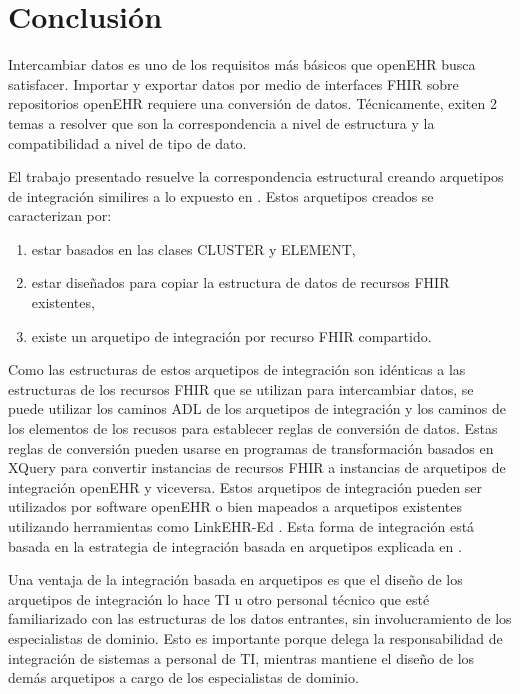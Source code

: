 \section{Conclusión}

Intercambiar datos es uno de los requisitos más básicos que openEHR busca satisfacer. Importar y exportar datos por medio de interfaces FHIR sobre repositorios openEHR requiere una conversión de datos. Técnicamente, exiten 2 temas a resolver que son la correspondencia a nivel de estructura y la compatibilidad a nivel de tipo de dato.

El trabajo presentado resuelve la correspondencia estructural creando arquetipos de integración similires a lo expuesto en \cite{openEHRArchitecture}. Estos arquetipos creados se caracterizan por:

\begin{enumerate}
  \item estar basados en las clases CLUSTER y ELEMENT,
  \item estar diseñados para copiar la estructura de datos de recursos FHIR existentes,
  \item existe un arquetipo de integración por recurso FHIR compartido.
\end{enumerate}

Como las estructuras de estos arquetipos de integración son idénticas a las estructuras de los recursos FHIR que se utilizan para intercambiar datos, se puede utilizar los caminos ADL de los arquetipos de integración y los caminos de los elementos de los recusos para establecer reglas de conversión de datos. Estas reglas de conversión pueden usarse en programas de transformación basados en XQuery para convertir instancias de recursos FHIR a instancias de arquetipos de integración openEHR y viceversa. Estos arquetipos de integración pueden ser utilizados por software openEHR o bien mapeados a arquetipos existentes utilizando herramientas como LinkEHR-Ed \cite{Maldonado09}. Esta forma de integración está basada en la estrategia de integración basada en arquetipos explicada en \cite{openEHRIntegration}.

Una ventaja de la integración basada en arquetipos es que el diseño de los arquetipos de integración lo hace TI u otro personal técnico que esté familiarizado con las estructuras de los datos entrantes, sin involucramiento de los especialistas de dominio. Esto es importante porque delega la responsabilidad de integración de sistemas a personal de TI, mientras mantiene el diseño de los demás arquetipos a cargo de los especialistas de dominio.

